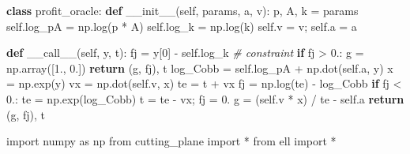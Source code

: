 \documentclass[]{article}
\newenvironment{Shaded}{}{}
\newcommand{\CommentTok}[1]{\textcolor[rgb]{0.38,0.63,0.69}{\textit{#1}}}
\newcommand{\ControlFlowTok}[1]{\textcolor[rgb]{0.00,0.44,0.13}{\textbf{#1}}}
\newcommand{\DecValTok}[1]{\textcolor[rgb]{0.25,0.63,0.44}{#1}}
\newcommand{\FloatTok}[1]{\textcolor[rgb]{0.25,0.63,0.44}{#1}}
\newcommand{\FunctionTok}[1]{\textcolor[rgb]{0.02,0.16,0.49}{#1}}
\newcommand{\ImportTok}[1]{#1}
\newcommand{\KeywordTok}[1]{\textcolor[rgb]{0.00,0.44,0.13}{\textbf{#1}}}
\newcommand{\NormalTok}[1]{#1}
\newcommand{\OperatorTok}[1]{\textcolor[rgb]{0.40,0.40,0.40}{#1}}
\newcommand{\VariableTok}[1]{\textcolor[rgb]{0.10,0.09,0.49}{#1}}
\begin{document}
\begin{Shaded}
\begin{Highlighting}[]
\KeywordTok{class}\NormalTok{ profit_oracle:}
    \KeywordTok{def} \FunctionTok{__init__}\NormalTok{(}\VariableTok{self}\NormalTok{, params, a, v):}
\NormalTok{        p, A, k }\OperatorTok{=}\NormalTok{ params}
        \VariableTok{self}\NormalTok{.log_pA }\OperatorTok{=}\NormalTok{ np.log(p }\OperatorTok{*}\NormalTok{ A)}
        \VariableTok{self}\NormalTok{.log_k }\OperatorTok{=}\NormalTok{ np.log(k)}
        \VariableTok{self}\NormalTok{.v }\OperatorTok{=}\NormalTok{ v}\OperatorTok{;} \VariableTok{self}\NormalTok{.a }\OperatorTok{=}\NormalTok{ a}

    \KeywordTok{def} \FunctionTok{__call__}\NormalTok{(}\VariableTok{self}\NormalTok{, y, t):}
\NormalTok{        fj }\OperatorTok{=}\NormalTok{ y[}\DecValTok{0}\NormalTok{] }\OperatorTok{-} \VariableTok{self}\NormalTok{.log_k  }\CommentTok{# constraint}
        \ControlFlowTok{if}\NormalTok{ fj }\OperatorTok{>} \FloatTok{0.}\NormalTok{:}
\NormalTok{            g }\OperatorTok{=}\NormalTok{ np.array([}\FloatTok{1.}\NormalTok{, }\FloatTok{0.}\NormalTok{])}
            \ControlFlowTok{return}\NormalTok{ (g, fj), t}
\NormalTok{        log_Cobb }\OperatorTok{=} \VariableTok{self}\NormalTok{.log_pA }\OperatorTok{+}\NormalTok{ np.dot(}\VariableTok{self}\NormalTok{.a, y)}
\NormalTok{        x }\OperatorTok{=}\NormalTok{ np.exp(y)}
\NormalTok{        vx }\OperatorTok{=}\NormalTok{ np.dot(}\VariableTok{self}\NormalTok{.v, x)}
\NormalTok{        te }\OperatorTok{=}\NormalTok{ t }\OperatorTok{+}\NormalTok{ vx}
\NormalTok{        fj }\OperatorTok{=}\NormalTok{ np.log(te) }\OperatorTok{-}\NormalTok{ log_Cobb}
        \ControlFlowTok{if}\NormalTok{ fj }\OperatorTok{<} \FloatTok{0.}\NormalTok{:}
\NormalTok{            te }\OperatorTok{=}\NormalTok{ np.exp(log_Cobb)}
\NormalTok{            t }\OperatorTok{=}\NormalTok{ te }\OperatorTok{-}\NormalTok{ vx}\OperatorTok{;}\NormalTok{ fj }\OperatorTok{=} \FloatTok{0.}
\NormalTok{        g }\OperatorTok{=}\NormalTok{ (}\VariableTok{self}\NormalTok{.v }\OperatorTok{*}\NormalTok{ x) }\OperatorTok{/}\NormalTok{ te }\OperatorTok{-} \VariableTok{self}\NormalTok{.a}
        \ControlFlowTok{return}\NormalTok{ (g, fj), t}

\ImportTok{import}\NormalTok{ numpy }\ImportTok{as}\NormalTok{ np}
\ImportTok{from}\NormalTok{ cutting_plane }\ImportTok{import} \OperatorTok{*}
\ImportTok{from}\NormalTok{ ell }\ImportTok{import} \OperatorTok{*}


\end{Highlighting}
\end{Shaded}
\end{document}
